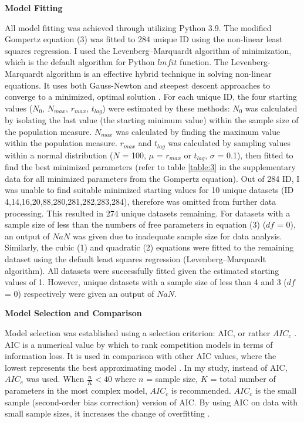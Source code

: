 \documentclass[11pt]{article}
\begin{document}
\noindent\textbf{Model Fitting}

All model fitting was achieved through utilizing Python 3.9. The modified Gompertz equation (3) was fitted to 284 unique ID 
using the non-linear least squares regression. I used the Levenberg–Marquardt algorithm of minimization, which is the default 
algorithm for Python $lmfit$ function.  The Levenberg-Marquardt algorithm is an effective 
hybrid technique in solving non-linear equations. It uses both Gauss-Newton and steepest descent approaches to converge 
to a minimized, optimal solution \cite{wilson_chapter_2013}. For each unique ID, the four starting values ($N_{0}$, $N_{max}$, $r_{max}$, $t_{lag}$)
were estimated by these methods: $N_{0}$ was calculated by isolating the last value (the starting minimum value) within the sample size of 
the population measure. $N_{max}$ was calculated by finding the maximum value within the population measure. $r_{max}$ and $t_{lag}$
was calculated by sampling values within a normal distribution ($N$ = 100, $\mu$ = $r_{max}$ or $t_{lag}$, $\sigma$ = 0.1), then fitted  
to find the best minimized parameters (refer to table \ref{table:3} in the supplementary data for all minimized parameters from the Gompertz equation). 
Out of 284 ID, I was unable to find suitable minimized starting values for 10 unique datasets
(ID 4,14,16,20,88,280,281,282,283,284), therefore was omitted from further data processing. This resulted in 274 unique datasets remaining. 
For datasets with a sample size of less than the numbers of free parameters in equation (3) ($df$ = 0), an output of $NaN$ was given due to 
inadequate sample size for data analysis. Similarly, the cubic (1) and quadratic (2) equations were fitted to the remaining dataset 
using the default least squares regression (Levenberg–Marquardt algorithm). All datasets were successfully fitted given the 
estimated starting values of 1. However, unique datasets with a sample size of less than 4 and 3 ($df$ = 0) respectively were given an output of $NaN$. 

\noindent\textbf{Model Selection and Comparison}

Model selection was established using a selection criterion: AIC, or rather $AIC_{c}$ \cite{burnham_multimodel_2004}. AIC is a numerical value by which to 
rank competition models in terms of information loss. It is used in comparison with other AIC values, where the lowest 
represents the best approximating model \cite{symonds_brief_2011}. In my study, instead of AIC, $AIC_{c}$ was used. When \(\frac{n}{K}<40\) where $n$ = sample size,
$K$ = total number of parameters in the most complex model, $AIC_{c}$ is recommended. $AIC_{c}$ is the small 
sample (second-order bias correction) version of AIC. By using AIC on data with small sample sizes, it increases the change 
of overfitting \cite{burnham_multimodel_2004}.
\end{document}
